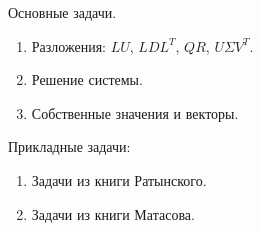 \documentclass[a4paper,12pt]{book}
\begin{document}
    Основные задачи.
    \begin{enumerate}
        \item Разложения: $LU$, $LDL^T$, $QR$, $U \Sigma V^T$.
        \item Решение системы.
        \item Собственные значения и векторы.
    \end{enumerate}

    Прикладные задачи:
    \begin{enumerate}
        \item Задачи из книги Ратынского.
        \item Задачи из книги Матасова.
    \end{enumerate}
\end{document}
